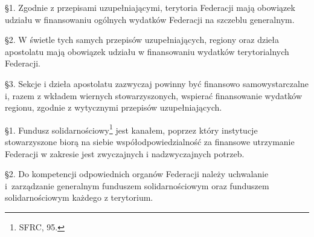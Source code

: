  \S{}1. Zgodnie z przepisami uzupełniającymi, terytoria Federacji mają obowiązek udziału w finansowaniu ogólnych wydatków Federacji na szczeblu generalnym.

\S{}2. W świetle tych samych przepisów uzupełniających, regiony oraz dzieła apostolatu mają obowiązek udziału w finansowaniu wydatków terytorialnych Federacji.

\S{}3. Sekcje i dzieła apostolatu zazwyczaj powinny być finansowo samowystarczalne i, razem z wkładem wiernych stowarzyszonych, wspierać finansowanie wydatków regionu, zgodnie z wytycznymi przepisów uzupełniających.


 \S{}1. Fundusz solidarnościowy\footnote{SFRC, 95.} jest kanałem, poprzez który instytucje stowarzyszone biorą na siebie współodpowiedzialność za finansowe utrzymanie Federacji w zakresie jest zwyczajnych i nadzwyczajnych potrzeb.

\S{}2. Do kompetencji odpowiednich organów Federacji należy uchwalanie \mbox{i zarządzanie} generalnym funduszem solidarnościowym oraz funduszem solidarnościowym każdego z terytorium. 
